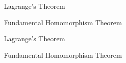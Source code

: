 
\begin{frame}
  \begin{center}
    Lagrange's Theorem
  \end{center}

  \begin{center}
  \end{center}
\end{frame}

\begin{frame}
  \begin{center}
    Fundamental Homomorphism Theorem
  \end{center}
  \begin{center}
  \end{center}
\end{frame}

\begin{frame}
  \begin{center}
    Lagrange's Theorem

    \vspace{0.80cm}

    \vspace{0.80cm}
    Fundamental Homomorphism Theorem
  \end{center}
\end{frame}
